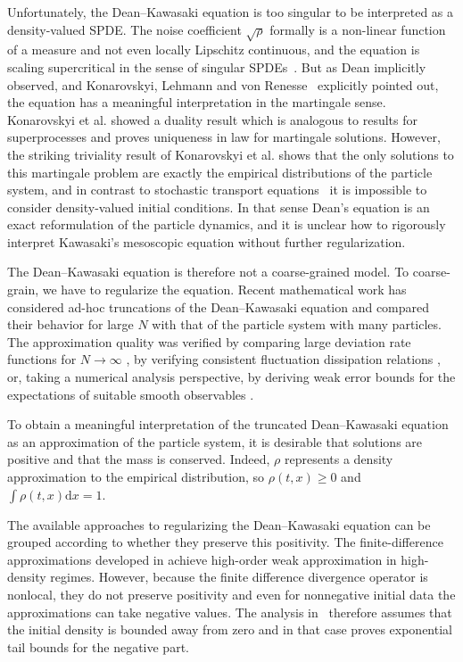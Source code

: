 \documentclass[a4paper,12pt]{article}
\newcommand{\mathd}{\mathrm{d}}
\begin{document}
Unfortunately, the Dean--Kawasaki equation is too singular to be interpreted as a
density-valued SPDE. The noise coefficient $\sqrt{\rho}$ formally is a non-linear function of a measure and not even locally Lipschitz continuous, and the equation is scaling
supercritical in the sense of singular SPDEs~\cite{Hairer2014, Gubinelli2015Paracontrolled}. But as Dean implicitly observed, and Konarovskyi, Lehmann and von Renesse~\cite{Konarovskyi2019} explicitly pointed out, the equation has a meaningful interpretation in the martingale sense. Konarovskyi et al. showed a duality result which is analogous to results for superprocesses and proves uniqueness in law for martingale solutions. However, the striking triviality result of Konarovskyi et al. shows that the only solutions to this martingale problem are exactly the empirical distributions of the particle system, and in contrast to stochastic transport equations~\cite{Kunita1990} it is impossible to consider density-valued initial conditions. In that sense Dean's equation is an exact reformulation of the particle dynamics, and it is unclear how to rigorously interpret  Kawasaki's mesoscopic equation without further regularization.

The Dean--Kawasaki equation is therefore not a coarse-grained model. To coarse-grain, we have to regularize the equation. Recent mathematical work has considered ad-hoc truncations of the Dean--Kawasaki equation and compared their behavior for large $N$ with that of the particle system with many particles. The approximation quality was verified by comparing large deviation rate functions for $N\to \infty$ \cite{Fehrman2023, Fehrman2024}, by verifying consistent fluctuation dissipation relations \cite{Donev2010, Bell2026}, or, taking a numerical analysis perspective, by deriving weak error bounds for the expectations of suitable smooth observables \cite{Cornalba2023, Cornalba2023Density, Djurdjevac2024, Djurdjevac2026}. 


To obtain a meaningful interpretation of the truncated Dean--Kawasaki equation as an approximation of the particle system, it is desirable that solutions are positive and that the mass is conserved. Indeed, $\rho$ represents  a density approximation to the empirical distribution, so $\rho(t,x) \geq 0$ and $\int \rho(t,x)\mathd x = 1$.
 

The available approaches to regularizing the Dean--Kawasaki equation can be grouped according to whether they preserve this positivity. The finite-difference approximations developed in  \cite{Cornalba2023, Cornalba2023Density} achieve high-order weak approximation in high-density regimes. However, because the finite difference divergence operator is nonlocal, they do not preserve positivity and even for nonnegative initial data the approximations can take negative values. The analysis in~\cite{Cornalba2023, Cornalba2023Density} therefore assumes that the initial density is bounded away from zero and in that case proves exponential tail bounds for the negative part. 
\end{document}
